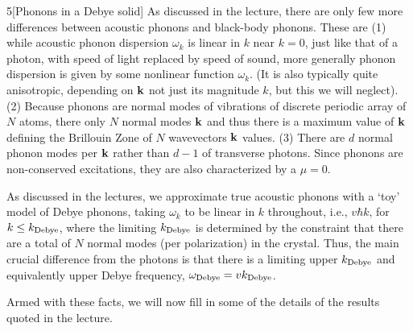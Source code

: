 \documentclass[12pt]{article}
\begin{document}
\begin{problem}{5}[Phonons in a Debye solid]
As discussed in the lecture, there are only few more differences between
acoustic phonons and black-body phonons. These are (1) while acoustic phonon
dispersion $\omega_k$ is linear in $k$ near $k=0$, just like that of a photon,
with speed of light replaced by speed of sound, more generally phonon dispersion
is given by some nonlinear function $\omega_k$. (It is also typically quite
anisotropic, depending on $\vb{k}$ not just its magnitude $k$, but this we will
neglect). (2) Because phonons are normal modes of vibrations of discrete
periodic array of $N$ atoms, there only $N$ normal modes $\vb{k}$ and thus there
is a maximum value of $\vb{k}$ defining the Brillouin Zone of $N$ wavevectors
$\vb{k}$ values. (3) There are $d$ normal phonon modes per $\vb{k}$ rather than
$d-1$ of transverse photons. Since phonons are non-conserved excitations, they
are also characterized by a $\mu=0$.

As discussed in the lectures, we approximate true acoustic phonons with a `toy'
model of Debye phonons, taking $\omega_k$ to be linear in $k$ throughout, i.e.,
$v\hbar k$, for $k\leq k_{\text{Debye}}$, where the limiting $k_{\text{Debye}}$ is
determined by the constraint that there are a total of $N$ normal modes (per
polarization) in the crystal. Thus, the main crucial difference from the photons
is that there is a limiting upper $k_{\text{Debye}}$ and equivalently upper Debye
frequency, $\omega_{\text{Debye}}=vk_{\text{Debye}}$.

Armed with these facts, we will now fill in some of the details of the results
quoted in the lecture.


\end{problem}
\end{document}
